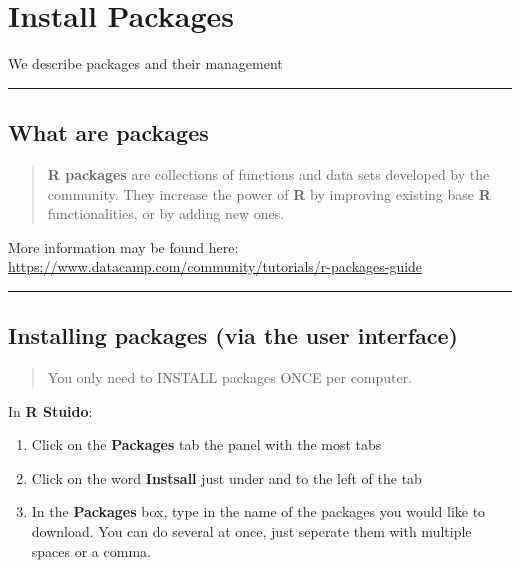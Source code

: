 \documentclass[]{book}
\providecommand{\tightlist}{%
  \setlength{\itemsep}{0pt}\setlength{\parskip}{0pt}}
\begin{document}
\chapter{Install Packages}\label{install-packages}

We describe packages and their management

\begin{center}\rule{0.5\linewidth}{\linethickness}\end{center}

\section{What are packages}\label{what-are-packages}

\begin{quote}
\textbf{R packages} are collections of functions and data sets developed
by the community. They increase the power of \textbf{R} by improving
existing base \textbf{R} functionalities, or by adding new ones.
\end{quote}

More information may be found here:
\url{https://www.datacamp.com/community/tutorials/r-packages-guide}

\begin{center}\rule{0.5\linewidth}{\linethickness}\end{center}

\section{Installing packages (via the user
interface)}\label{installing-packages-via-the-user-interface}

\begin{quote}
You only need to INSTALL packages ONCE per computer.
\end{quote}

In \textbf{R Stuido}:

\begin{enumerate}
\def\labelenumi{\arabic{enumi}.}
\tightlist
\item
  Click on the \textbf{Packages} tab the panel with the most tabs
\item
  Click on the word \textbf{Instsall} just under and to the left of the
  tab
\item
  In the \textbf{Packages} box, type in the name of the packages you
  would like to download. You can do several at once, just seperate them
  with multiple spaces or a comma.
\end{enumerate}
\end{document}
